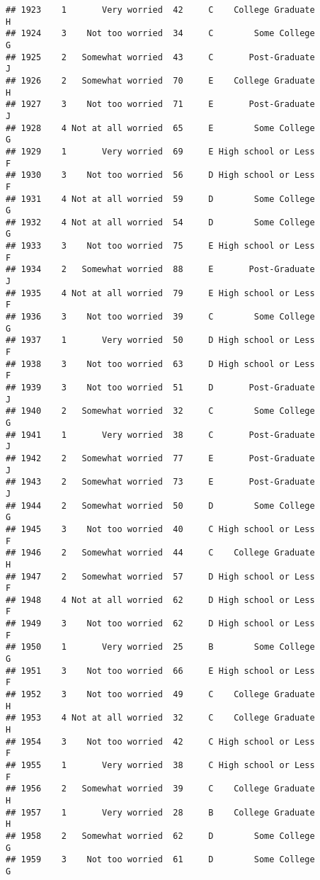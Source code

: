 \documentclass[
]{article}
\begin{document}
\begin{verbatim}
## 1923    1       Very worried  42     C    College Graduate         H
## 1924    3    Not too worried  34     C        Some College         G
## 1925    2   Somewhat worried  43     C       Post-Graduate         J
## 1926    2   Somewhat worried  70     E    College Graduate         H
## 1927    3    Not too worried  71     E       Post-Graduate         J
## 1928    4 Not at all worried  65     E        Some College         G
## 1929    1       Very worried  69     E High school or Less         F
## 1930    3    Not too worried  56     D High school or Less         F
## 1931    4 Not at all worried  59     D        Some College         G
## 1932    4 Not at all worried  54     D        Some College         G
## 1933    3    Not too worried  75     E High school or Less         F
## 1934    2   Somewhat worried  88     E       Post-Graduate         J
## 1935    4 Not at all worried  79     E High school or Less         F
## 1936    3    Not too worried  39     C        Some College         G
## 1937    1       Very worried  50     D High school or Less         F
## 1938    3    Not too worried  63     D High school or Less         F
## 1939    3    Not too worried  51     D       Post-Graduate         J
## 1940    2   Somewhat worried  32     C        Some College         G
## 1941    1       Very worried  38     C       Post-Graduate         J
## 1942    2   Somewhat worried  77     E       Post-Graduate         J
## 1943    2   Somewhat worried  73     E       Post-Graduate         J
## 1944    2   Somewhat worried  50     D        Some College         G
## 1945    3    Not too worried  40     C High school or Less         F
## 1946    2   Somewhat worried  44     C    College Graduate         H
## 1947    2   Somewhat worried  57     D High school or Less         F
## 1948    4 Not at all worried  62     D High school or Less         F
## 1949    3    Not too worried  62     D High school or Less         F
## 1950    1       Very worried  25     B        Some College         G
## 1951    3    Not too worried  66     E High school or Less         F
## 1952    3    Not too worried  49     C    College Graduate         H
## 1953    4 Not at all worried  32     C    College Graduate         H
## 1954    3    Not too worried  42     C High school or Less         F
## 1955    1       Very worried  38     C High school or Less         F
## 1956    2   Somewhat worried  39     C    College Graduate         H
## 1957    1       Very worried  28     B    College Graduate         H
## 1958    2   Somewhat worried  62     D        Some College         G
## 1959    3    Not too worried  61     D        Some College         G

\end{verbatim}
\end{document}
